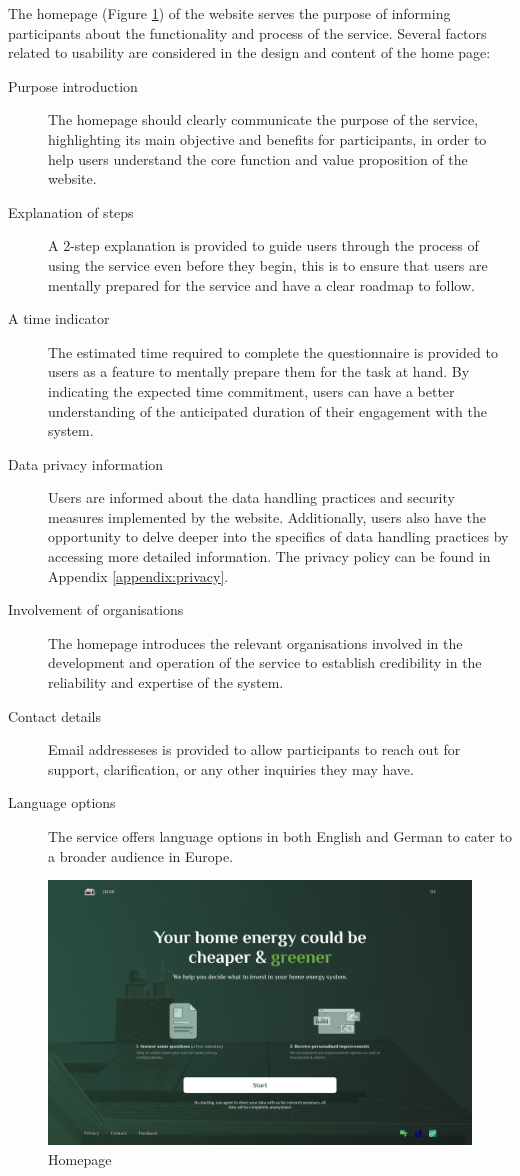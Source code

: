 The homepage (Figure \ref{fig:homepage}) of the website serves the purpose of informing participants about the functionality and process of the service. 
Several factors related to usability are considered in the design and content of the home page:
\begin{description}
  \item[Purpose introduction] The homepage should clearly communicate the purpose of the service, highlighting its main objective and benefits for participants, in order to help users understand the core function and value proposition of the website.
  \item[Explanation of steps] A 2-step explanation is provided to guide users through the process of using the service even before they begin, this is to ensure that users are mentally prepared for the service and have a clear roadmap to follow. 
  \item[A time indicator] The estimated time required to complete the questionnaire is provided to users as a feature to mentally prepare them for the task at hand. By indicating the expected time commitment, users can have a better understanding of the anticipated duration of their engagement with the system. 
  \item[Data privacy information] Users are informed about the data handling practices and security measures implemented by the website. Additionally, users also have the opportunity to delve deeper into the specifics of data handling practices by accessing more detailed information. The privacy policy can be found in Appendix \ref{appendix:privacy}. 
  \item[Involvement of organisations] The homepage introduces the relevant organisations involved in the development and operation of the service to establish credibility in the reliability and expertise of the system.
  \item[Contact details] Email addresseses is provided to allow participants to reach out for support, clarification, or any other inquiries they may have.
  \item[Language options] The service offers language options in both English and German to cater to a broader audience in Europe.
\end{description}
\begin{figure}[h!]
  \centering
  \includegraphics[width=\textwidth]{Images/welcome.png}
  \caption{Homepage}
  \label{fig:homepage}
\end{figure}


